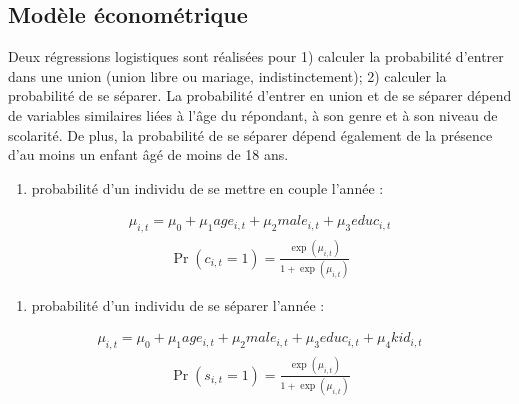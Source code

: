 \documentclass[letterpaper,10pt,french]{sphinxmanual}
\begin{document}
\subsection{Modèle économétrique}
\label{\detokenize{transition_models:id5}}
Deux régressions logistiques sont réalisées pour 1) calculer la probabilité d’entrer dans une union (union libre ou mariage, indistinctement); 2) calculer la probabilité de se séparer. La probabilité d’entrer en union et de se séparer dépend de variables similaires liées à l’âge du répondant, à son genre et à son niveau de scolarité. De plus, la probabilité de se séparer dépend également de la présence d’au moins un enfant âgé de moins de 18 ans.
\begin{enumerate}
%
\item {} 
probabilité  d’un individu  de se mettre en couple l’année  :

\end{enumerate}
\begin{equation*}
\begin{split}\mu_{i,t} = \mu_{0} + \mu_{1} age_{i,t} + \mu_{2} male_{i,t} + \mu_{3} educ_{i,t}\end{split}
\end{equation*}\begin{equation*}
\begin{split}\Pr(c_{i,t}=1) = \frac{\exp(\mu_{i,t})}{1+\exp(\mu_{i,t})}\end{split}
\end{equation*}\begin{enumerate}
%
\setcounter{enumi}{1}
\item {} 
probabilité  d’un individu  de se séparer l’année  :

\end{enumerate}
\begin{equation*}
\begin{split}\mu_{i,t} = \mu_{0} + \mu_{1} age_{i,t} + \mu_{2} male_{i,t} + \mu_{3} educ_{i,t} + \mu_{4} kid_{i,t}\end{split}
\end{equation*}\begin{equation*}
\begin{split}\Pr(s_{i,t}=1) = \frac{\exp(\mu_{i,t})}{1+\exp(\mu_{i,t})}\end{split}
\end{equation*}
\end{document}
